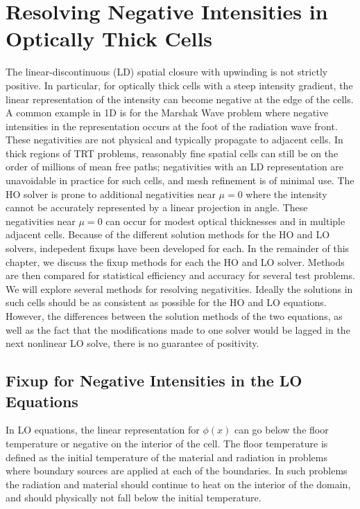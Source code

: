 

\chapter{Resolving Negative Intensities in Optically Thick Cells}

The linear-discontinuous (LD) spatial closure with upwinding is not
strictly positive.  In particular, for optically thick cells with a steep intensity
gradient, the linear representation of the intensity can become negative at the edge of the cells.
A common example in 1D is for the Marshak Wave
problem where negative
intensities in the representation occurs at the foot of the radiation wave front. These negativities are not physical and typically propagate to
adjacent cells. In thick regions of
TRT problems, reasonably fine spatial cells can still be on the order of millions of mean
free paths; negativities with an LD representation are unavoidable in practice for
such cells, and mesh refinement is of minimal use.
The HO solver is prone to additional negativities near $\mu=0$ where the intensity
cannot be accurately represented by a linear projection in angle.  These negativities near
$\mu=0$ can occur for modest optical thicknesses and in multiple adjacent cells.
Because of the different solution methods for the HO and LO solvers, indepedent fixups
have been developed for each. 
In the remainder of this chapter, we discuss the fixup methods for each the HO and LO
solver.  Methods are then compared for statistical efficiency and accuracy for several test problems.
      We will explore several methods
for resolving negativities.  Ideally the solutions in
such cells should be as consistent as possible for the HO and LO equations.  However,
the differences between the solution methods of the two equations, as well as the
fact that the modifications made to one solver would be lagged in the next nonlinear LO solve, there
is no guarantee of positivity.  

\section{Fixup for Negative Intensities in the LO Equations}
\label{sec:negs}

In LO equations, the linear representation for $\phi(x)$ can go below the floor
temperature or negative on the interior of the cell.
The floor temperature is defined as the initial
temperature of the material and radiation in problems where boundary sources are
applied at each of the boundaries.  In such problems the radiation and material should
continue to heat on the interior of the domain, and should physically not fall below
the initial temperature. 

